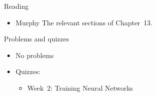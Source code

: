 \documentclass[10pt]{beamer}
\begin{document}
\begin{titledslide}{Reading}

  \begin{itemize}
  \item Murphy The relevant sections of Chapter~13. 
  \end{itemize}
  
  
\end{titledslide}
\begin{titledslide}{Problems and quizzes}

  \begin{itemize}
  \item No problems
  \item Quizzes:
    \begin{itemize}
    \item Week~2: Training Neural Networks
    \end{itemize}
  \end{itemize}
  
\end{titledslide}


\end{document}
